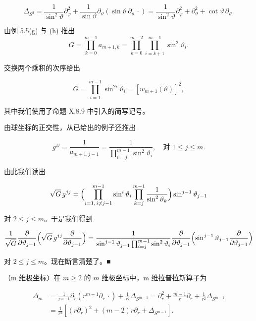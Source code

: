 \begin{example}
\begin{items}
\[
\Delta_{S^{2}} = \frac{1}{\sin^{2}\vartheta}\partial_{\varphi}^{2} + \frac{1}{\sin\vartheta}\partial_{\vartheta}(\sin\vartheta\,\partial_{\vartheta}\,\cdot) = \frac{1}{\sin^{2}\vartheta}\partial_{\varphi}^{2} + \partial_{\vartheta}^{2} + \cot\vartheta\,\partial_{\vartheta}.
\]

\proofhead
由例 5.5(g) 与 (h) 推出
\[
G = \prod_{k=0}^{m-1}a_{m+1,k} = \prod_{k=0}^{m-2}\prod_{i=k+1}^{m-1}\sin^{2}\vartheta_{i}.
\]
\end{items}


交换两个乘积的次序给出

\begin{equation}
G = \prod_{i=1}^{m-1}\sin^{2i}\vartheta_{i} = \left[w_{m+1}(\vartheta)\right]^{2},\tag{6.17}
\end{equation}

其中我们使用了命题 X.8.9 中引入的简写记号。

由球坐标的正交性，从已给出的例子还推出

\[
g^{jj} = \frac{1}{a_{m+1,j-1}} = \frac{1}{\prod_{i=j}^{m-1}\sin^{2}\vartheta_{i}}, \quad \text{对 } 1 \le j \le m.
\]

由此我们读出

\[
\sqrt{G}\,g^{jj} = \Bigl(\prod_{i=1,\,i\ne j-1}^{m-1}\sin^{i}\vartheta_{i}\prod_{k=j}^{m-1}\frac{1}{\sin^{2}\vartheta_{k}}\Bigr)\sin^{j-1}\vartheta_{j-1}
\]

对 $ 2 \le j \le m $。于是我们得到

\[
\frac{1}{\sqrt{G}}\frac{\partial}{\partial\vartheta_{j-1}}\Bigl(\sqrt{G}\,g^{jj}\frac{\partial}{\partial\vartheta_{j-1}}\Bigr) = \frac{1}{\sin^{j-1}\vartheta_{j-1}\prod_{i=j}^{m-1}\sin^{2}\vartheta_{i}}\frac{\partial}{\partial\vartheta_{j-1}}\Bigl(\sin^{j-1}\vartheta_{j-1}\frac{\partial}{\partial\vartheta_{j-1}}\Bigr)
\]

对 $ 2 \le j \le m $。现在断言清楚了。\nobreak\hspace{0.35em}■

\begin{items}
\item[（e）]

（m 维极坐标）在 $ m \ge 2 $ 的 $ m $ 维极坐标中，m 维拉普拉斯算子为

\begin{equation*}
\begin{aligned}
\Delta_{m} &= \frac{1}{r^{m-1}}\partial_{r}(r^{m-1}\partial_{r}\,\cdot) + \frac{1}{r^{2}}\Delta_{S^{m-1}} = \partial_{r}^{2} + \frac{m-1}{r}\partial_{r} + \frac{1}{r^{2}}\Delta_{S^{m-1}} \\ &= \frac{1}{r^{2}}\left[(r\partial_{r})^{2} + (m-2)r\partial_{r} + \Delta_{S^{m-1}}\right].
\end{aligned}
\end{equation*}


\end{items}
\end{example}
